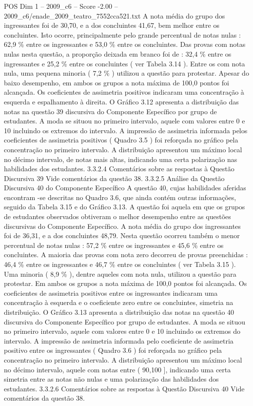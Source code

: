\begin{textsample}{POS Dim 1 – 2009\_c6 – Score -2.00 – 2009\_c6/enade\_2009\_teatro\_7552cca521.txt}
A nota média do grupo dos ingressantes foi de 30,70, e a dos concluintes 41,67, bem melhor entre os concluintes.
Isto ocorre, principalmente pelo grande percentual de notas nulas : 62,9 \% entre os ingressantes e 53,0 \% entre os concluintes.
Das provas com notas nulas nesta questão, a proporção deixada em branco foi de : 32,4 \% entre os ingressantes e 25,2 \% entre os concluintes ( ver Tabela 3.14 ).
Entre os com nota nula, uma pequena minoria ( 7,2 \% ) utilizou a questão para protestar.
Apesar do baixo desempenho, em ambos os grupos a nota máxima de 100,0 pontos foi alcançada.
Os coeficientes de assimetria positivos indicaram uma concentração à esquerda e espalhamento à direita.
O Gráfico 3.12 apresenta a distribuição das notas na questão 39 discursiva do Componente Específico por grupo de estudantes.
A moda se situou no primeiro intervalo, aquele com valores entre 0 e 10 incluindo os extremos do intervalo.
A impressão de assimetria informada pelos coeficientes de assimetria positivos ( Quadro 3.5 ) foi reforçada no gráfico pela concentração no primeiro intervalo.
A distribuição apresentou um máximo local no décimo intervalo, de notas mais altas, indicando uma certa polarização nas habilidades dos estudantes. 3.3.2.4 Comentários sobre as respostas à Questão Discursiva 39 Vide comentários da questão 38. 3.3.2.5 Análise da Questão Discursiva 40 do Componente Específico A questão 40, cujas habilidades aferidas encontram -se descritas no Quadro 3.6, que ainda contém outras informações, seguido da Tabela 3.15 e do Gráfico 3.13.
A questão foi aquela em que os grupos de estudantes observados obtiveram o melhor desempenho entre as questões discursivas do Componente Específico.
A nota média do grupo dos ingressantes foi de 36,31, e a dos concluintes 48,79.
Nesta questão ocorreu também o menor percentual de notas nulas : 57,2 \% entre os ingressantes e 45,6 \% entre os concluintes.
A maioria das provas com nota zero decorreu de provas preenchidas : 46,4 \% entre os ingressantes e 46,7 \% entre os concluintes ( ver Tabela 3.15 ).
Uma minoria ( 8,9 \% ), dentre aqueles com nota nula, utilizou a questão para protestar.
Em ambos os grupos a nota máxima de 100,0 pontos foi alcançada.
Os coeficientes de assimetria positivos entre os ingressantes indicaram uma concentração à esquerda e o coeficiente zero entre os concluintes, simetria na distribuição.
O Gráfico 3.13 apresenta a distribuição das notas na questão 40 discursiva do Componente Específico por grupo de estudantes.
A moda se situou no primeiro intervalo, aquele com valores entre 0 e 10 incluindo os extremos do intervalo.
A impressão de assimetria informada pelo coeficiente de assimetria positivo entre os ingressantes ( Quadro 3.6 ) foi reforçada no gráfico pela concentração no primeiro intervalo.
A distribuição apresentou um máximo local no décimo intervalo, aquele com notas entre ( 90,100 ], indicando uma certa simetria entre as notas não nulas e uma polarização das habilidades dos estudantes. 3.3.2.6 Comentários sobre as respostas à Questão Discursiva 40 Vide comentários da questão 38.

\end{textsample}
